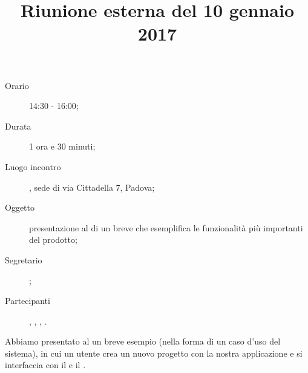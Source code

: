 


\author{\GG}
\supervisor{\MM}
\title{Riunione esterna del 10 gennaio 2017}



\maketitle

\begin{description}
	\item[Orario] 14:30 - 16:00;
	\item[Durata] 1 ora e 30 minuti;
	\item[Luogo incontro] \ZU, sede di via Cittadella 7, Padova;
	\item[Oggetto] presentazione al \GP di un breve  che esemplifica le funzionalità più importanti del prodotto;
	\item[Segretario] \MM; 
	\item[Partecipanti] \GP, \LB, \GG, \MM.
\end{description}

Abbiamo presentato al \GP un breve esempio (nella forma di un caso d'uso del sistema), in cui un utente crea un nuovo progetto con la nostra applicazione e si interfaccia con il  e il .


